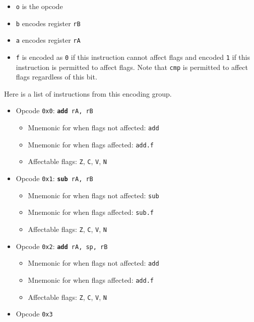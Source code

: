 \documentclass{article}
\begin{document}
	\singlespacing
	\begin{itemize}
	\item \texttt{o} is the opcode
	\item \texttt{b} encodes register \texttt{rB}
	\item \texttt{a} encodes register \texttt{rA}
	\item \texttt{f} is encoded as \texttt{0} if this instruction
	cannot affect flags and encoded \texttt{1} if this instruction is
	permitted to affect flags. Note that \texttt{cmp} is permitted to
	affect flags regardless of this bit.
	\end{itemize}
	\doublespacing

	Here is a list of instructions from this encoding group.

	\singlespacing
	\begin{itemize}
	\item Opcode \texttt{0x0}:
		\texttt{\textbf{add} rA, rB}
		\begin{itemize}
		\item Mnemonic for when flags not affected: \texttt{add}
		\item Mnemonic for when flags affected: \texttt{add.f}
		\item Affectable flags:
			\texttt{Z}, \texttt{C}, \texttt{V}, \texttt{N}
		\end{itemize}
	\item Opcode \texttt{0x1}:
		\texttt{\textbf{sub} rA, rB}
		\begin{itemize}
		\item Mnemonic for when flags not affected: \texttt{sub}
		\item Mnemonic for when flags affected: \texttt{sub.f}
		\item Affectable flags:
			\texttt{Z}, \texttt{C}, \texttt{V}, \texttt{N}
		\end{itemize}
	\item Opcode \texttt{0x2}:
		\texttt{\textbf{add} rA, sp, rB}
		\begin{itemize}
		\item Mnemonic for when flags not affected: \texttt{add}
		\item Mnemonic for when flags affected: \texttt{add.f}
		\item Affectable flags:
			\texttt{Z}, \texttt{C}, \texttt{V}, \texttt{N}
		\end{itemize}
	\item Opcode \texttt{0x3}

\end{itemize}
\end{document}
